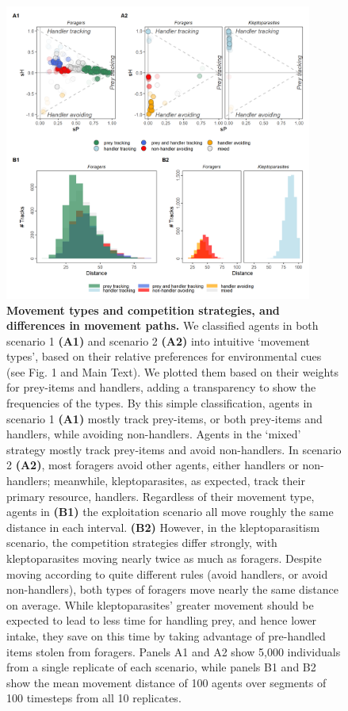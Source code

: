     \begin{figure}[h!]
        \centering
        \includegraphics[width=0.90\textwidth]{figures/patternprocess/fig_02.png}
        \caption{
            \textbf{Movement types and competition strategies, and differences in movement paths.}
            We classified agents in both scenario 1 \textbf{(A1)} and scenario 2 \textbf{(A2)} into intuitive `movement types', based on their relative preferences for environmental cues (see Fig. 1 and Main Text). 
            We plotted them based on their weights for prey-items and handlers, adding a transparency to show the frequencies of the types.
            By this simple classification, agents in scenario 1 \textbf{(A1)} mostly track prey-items, or both prey-items and handlers, while avoiding non-handlers.
            Agents in the `mixed' strategy mostly track prey-items and avoid non-handlers.
            In scenario 2 \textbf{(A2)}, most foragers avoid other agents, either handlers or non-handlers; meanwhile, kleptoparasites, as expected, track their primary resource, handlers.
            Regardless of their movement type, agents in \textbf{(B1)} the exploitation scenario all move roughly the same distance in each interval.
            \textbf{(B2)} However, in the kleptoparasitism scenario, the competition strategies differ strongly, with kleptoparasites moving nearly twice as much as foragers.
            Despite moving according to quite different rules (avoid handlers, or avoid non-handlers), both types of foragers move nearly the same distance on average.
            While kleptoparasites' greater movement should be expected to lead to less time for handling prey, and hence lower intake, they save on this time by taking advantage of pre-handled items stolen from foragers.
            Panels A1 and A2 show 5,000 individuals from a single replicate of each scenario, while panels B1 and B2 show the mean movement distance of 100 agents over segments of 100 timesteps from all 10 replicates.
        }
        \label{fig2}
    \end{figure}
    
